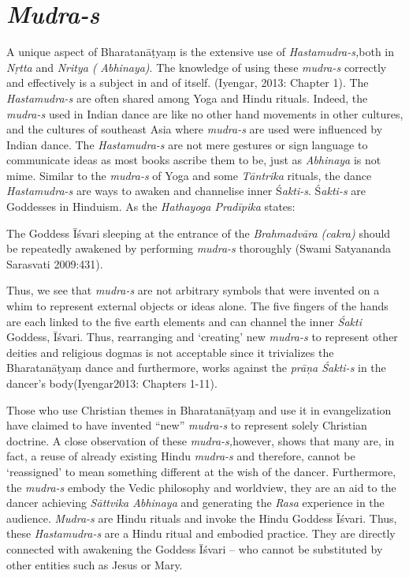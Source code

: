 \section*{\textit{Mudra-s}}

A unique aspect of Bharatanāṭyaṃ is the extensive use of \textit{Hastamudra-s,}\break both in \textit{Nṛtta }and \textit{Nritya (} \textit{Abhinaya)}. The knowledge of using these \textit{mudra-s }correctly and effectively is a subject in and of itself. (Iyengar, 2013: Chapter 1). The \textit{Hastamudra-s} are often shared among Yoga and Hindu rituals. Indeed, the \textit{mudra-s} used in Indian dance are like no other hand movements in other cultures, and the cultures of southeast Asia where \textit{mudra-s }are used were influenced by Indian dance. The \textit{Hastamudra-s }are not mere gestures or sign language to communicate ideas as most books ascribe them to be, just as \textit{Abhinaya }is not mime. Similar to the \textit{mudra-s }of Yoga and some \textit{Tāntrika} rituals, the dance \textit{Hastamudra-s} are ways to awaken and channelise inner Ś\textit{akti-s}. Ś\textit{akti-s} are Goddesses in Hinduism. As the \textit{Hathayoga Pradīpika} states:

The Goddess Īśvari sleeping at the entrance of the \textit{Brahmadvāra (cakra)} should be repeatedly awakened by performing \textit{mudra-s} thoroughly (Swami Satyananda Sarasvati 2009:431).

Thus, we see that \textit{mudra-s }are not arbitrary symbols that were invented on a whim to represent external objects or ideas alone. The five fingers of the hands are each linked to the five earth elements and can channel the inner \textit{Śakti} Goddess, Īśvari. Thus, rearranging and ‘creating’ new \textit{mudra-s }to represent other deities and religious dogmas is not acceptable since it trivializes the Bharatanāṭyaṃ dance and furthermore, works against the \textit{prāṇa Śakti-s} in the dancer’s body(Iyengar2013: Chapters 1-11).

Those who use Christian themes in Bharatanāṭyaṃ and use it in evangelization have claimed to have invented “new” \textit{mudra-s} to represent solely Christian doctrine. A close observation of these \textit{mudra-s,}however, shows that many are, in fact, a reuse of already existing Hindu \textit{mudra-s }and therefore, cannot be ‘reassigned’ to mean something different at the wish of the dancer. Furthermore, the \textit{mudra-s }embody the Vedic philosophy and worldview, they are an aid to the dancer achieving \textit{Sāttvika Abhinaya} and generating the \textit{Rasa} experience in the audience. \textit{Mudra-s }are Hindu rituals and invoke the Hindu Goddess Īśvari. Thus, these \textit{Hastamudra-s} are a Hindu ritual and embodied practice. They are directly connected with awakening the Goddess Īśvari – who cannot be substituted by other entities such as Jesus or Mary.


